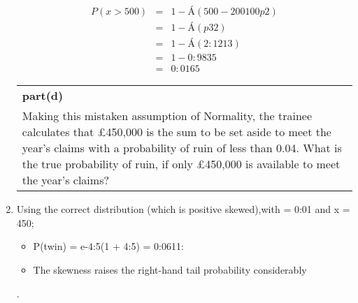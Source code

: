\documentclass[a4paper,12pt]{article}
\begin{document}
\begin{enumerate}
\begin{eqnarray*}
P(x > 500) &=& 1 - Á( 500-200
100
p2 ) \\
&=& 1 - Á(p3 2 )\\
&=& 1 - Á(2:1213) \\
&=& 1 - 0:9835 \\ &=& 0:0165
\end{eqnarray*}
\newpage
  \begin{table}[ht!]
     \centering
     \begin{tabular}{|p{15cm}|}
     \hline 
     \noindent \textbf{part(d)}\\
     Making this mistaken assumption of Normality, the trainee calculates that £450,000 is the sum to be set aside to meet the year’s claims with a probability of ruin of less than 0.04.  What is the true probability of ruin, if only £450,000 is available to meet the year’s claims?  \\ \hline 
      \end{tabular}
    \end{table}
\item Using the correct distribution (which is positive skewed),with \lambda = 0:01 and x = 450;

\begin{itemize}
    \item P(twin) = e-4:5(1 + 4:5) = 0:0611: 
    \item The skewness raises the right-hand tail probability
considerably
\end{itemize}
.

\end{enumerate}
\end{document}
